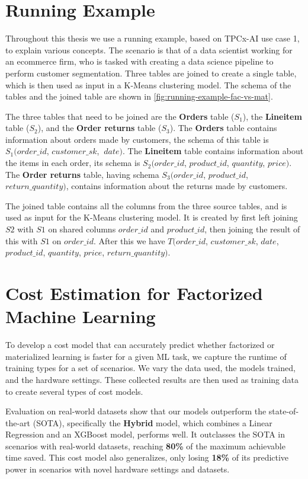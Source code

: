 \section{Running Example}
Throughout this thesis we use a running example, based on TPCx-AI\cite{tpcx-ai} use case 1, to explain various concepts. The scenario is that of a data scientist working for an ecommerce firm, who is tasked with creating a data science pipeline to perform customer segmentation. Three tables are joined to create a single table, which is then used as input in a K-Means clustering model. The schema of the tables and the joined table are shown in \autoref{fig:running-example-fac-vs-mat}.

The three tables that need to be joined are the \textbf{Orders} table ($S_1$), the \textbf{Lineitem} table ($S_2$), and the \textbf{Order returns} table ($S_3$). The \textbf{Orders} table contains information about orders made by customers, the schema of this table is $S_1(order\_id$, $customer\_sk$, $\ date)$. The \textbf{Lineitem} table contains information about the items in each order, its schema is $S_2(order\_id$, $product\_id$, $quantity$,  $price)$. The \textbf{Order returns} table, having schema $S_3(order\_id$, $product\_id$, $return\_quantity)$, contains information about the returns made by customers.

The joined table contains all the columns from the three source tables, and is used as input for the K-Means clustering model. It is created by first left joining $S2$ with $S1$ on shared columns $order\_id$ and $product\_id$, then joining the result of this with $S1$ on $order\_id$. After this we have $T(order\_id$, $customer\_sk$, $date$, $product\_id$, $quantity$, $price$, $return\_quantity)$.

\section{Cost Estimation for Factorized Machine Learning}
To develop a cost model that can accurately predict whether factorized or materialized learning is faster for a given ML task, we capture the runtime of training types for a set of scenarios. We vary the data used, the models trained, and the hardware settings. These collected results are then used as training data to create several types of cost models.

Evaluation on real-world datasets show that our models outperform the state-of-the-art (SOTA), specifically the \textbf{Hybrid} model, which combines a Linear Regression and an XGBoost model, performs well. It outclasses the SOTA in scenarios with real-world datasets, reaching \textbf{80\%} of the maximum achievable time saved. This cost model also generalizes, only losing \textbf{18\%} of its predictive power in scenarios with novel hardware settings and datasets.

